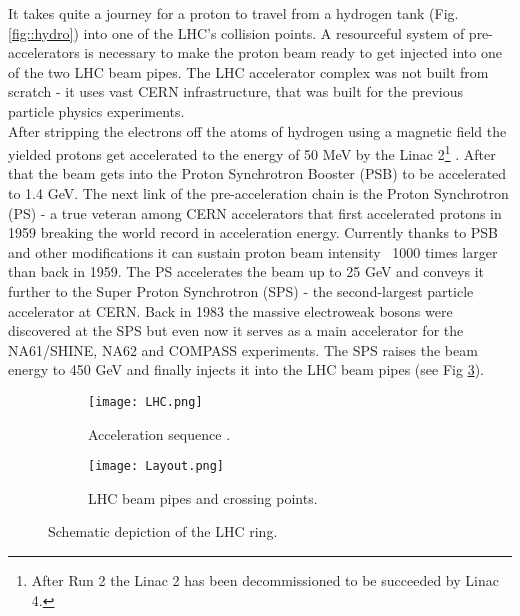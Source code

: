         It takes quite a journey for a proton to travel from a hydrogen tank (Fig. \ref{fig::hydro}) into one of the LHC's collision points. A resourceful system of pre-accelerators is necessary to make the proton beam ready to get injected into one of the two LHC beam pipes. The LHC accelerator complex was not built from scratch - it uses vast CERN infrastructure, that was built for the previous particle physics experiments. \\
        After stripping the electrons off the atoms of hydrogen using a magnetic field the yielded protons get accelerated to the energy of 50 MeV by the Linac 2\footnote{After Run 2 the Linac 2 has been decommissioned to be succeeded by Linac 4.} \cite{sequence}. After that the beam gets into the Proton Synchrotron Booster (PSB) to be accelerated to 1.4 GeV. The next link of the pre-acceleration chain is the Proton Synchrotron (PS) - a true veteran among CERN accelerators that first accelerated protons in 1959 breaking the world record in acceleration energy. Currently thanks to PSB and other modifications it can sustain proton beam intensity ~1000 times larger than back in 1959. The PS accelerates the beam up to 25 GeV and conveys it further to the Super Proton Synchrotron (SPS) - the second-largest particle accelerator at CERN. Back in 1983 the massive electroweak bosons were discovered at the SPS but even now it serves as a main accelerator for the NA61/SHINE, NA62 and COMPASS experiments. The SPS raises the beam energy to 450 GeV and finally injects it into the LHC beam pipes (see Fig \ref{fig::layout}).\\
   

	\begin{figure}[htbp]
	\begin{subfigure}[t]{0.48\textwidth}
		\texttt{[image: LHC.png]}
		\caption[Acceleration sequence]{Acceleration sequence \cite{sequence}.}
		\label{fig::seq}
	\end{subfigure}
	\hfill
	\begin{subfigure}[t]{0.48\textwidth}
		\texttt{[image: Layout.png]}
		\caption[Beam pipes]{LHC beam pipes and crossing points.}
		\label{fig::pipes}
	\end{subfigure}
	\caption{Schematic depiction of the LHC ring.}
	\label{fig::layout}
\end{figure}

